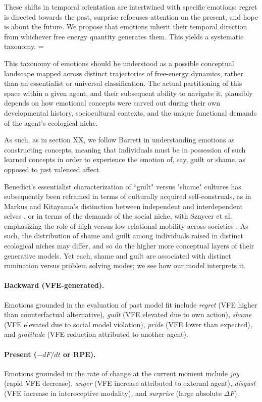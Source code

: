 \documentclass[11pt,a4paper]{article}
\newcommand{\rr}{\color{red!70!black}}
\begin{document}
These shifts in temporal orientation are intertwined with specific emotions: regret is directed towards the past, surprise refocuses attention on the present, and hope is about the future.
We propose that emotions inherit their temporal direction from whichever free energy quantity generates them. This yields a systematic taxonomy. 
={\rr This taxonomy of emotions should be understood as a possible conceptual landscape mapped across distinct trajectories of free-energy dynamics, rather than an essentialist or universal classification. The actual partitioning of this space within a given agent, and their subsequent ability to navigate it, plausibly depends on how emotional concepts were carved out during their own developmental history, sociocultural contexts, and the unique functional demands of the agent's ecological niche. 

As such, as in section XX, we follow Barrett in understanding emotions as constructing concepts, meaning that individuals must be in possession of such learned concepts in order to experience the emotion of, say, guilt or shame, as opposed to just valenced affect

Benedict’s essentialist characterization of “guilt" versus "shame" cultures \citep{benedict1946chrysanthemum} has subsequently been reframed in terms of culturally acquired self-construals, as in Markus and Kitayama’s distinction between independent and interdependent selves \citep{markus1991culture}, or in terms of the demands of the social niche, with Sznycer et al. emphasizing the role of high versus low relational mobility across societies \citep{sznycer2013cross}. As such, the distribution of shame and guilt among individuals raised in distinct ecological niches may differ, and so do the higher more conceptual layers of their generative models. Yet each, shame and guilt are associated with distinct rumination versus problem solving modes; we see how our model interprets it.
}

\paragraph{Backward (VFE-generated).} Emotions grounded in the evaluation of past model fit include \emph{regret} (VFE higher than counterfactual alternative), \emph{guilt} (VFE elevated due to own action), \emph{shame} (VFE elevated due to social model violation), \emph{pride} (VFE lower than expected), and \emph{gratitude} (VFE reduction attributed to another agent).

\paragraph{Present ($-dF/dt$ or RPE).} Emotions grounded in the rate of change at the current moment include \emph{joy} (rapid VFE decrease), \emph{anger} (VFE increase attributed to external agent), \emph{disgust} (VFE increase in interoceptive modality), and \emph{surprise} (large absolute $\Delta F$).
\end{document}
